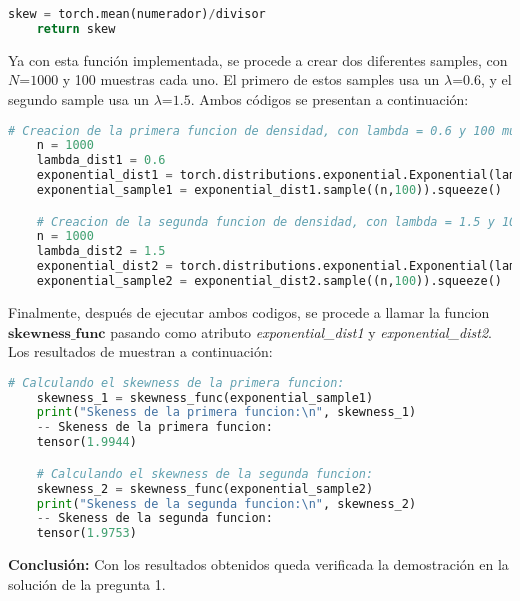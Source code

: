 \documentclass[spanish]{article}
\begin{document}
\begin{enumerate}
\begin{lstlisting}[language=Python]
    skew = torch.mean(numerador)/divisor
    return skew
\end{lstlisting}
Ya con esta funci\'{o}n implementada, se procede a crear dos diferentes samples, con $N\text{=1000}$ y 100 muestras cada uno. El primero de estos samples usa un $\lambda\text{=0.6}$, y el segundo sample usa un $\lambda\text{=1.5}$. Ambos c\'{o}digos se presentan a continuaci\'{o}n:
\begin{lstlisting}[language=Python]
    # Creacion de la primera funcion de densidad, con lambda = 0.6 y 100 muestras
    n = 1000
    lambda_dist1 = 0.6
    exponential_dist1 = torch.distributions.exponential.Exponential(lambda_dist1)
    exponential_sample1 = exponential_dist1.sample((n,100)).squeeze()

    # Creacion de la segunda funcion de densidad, con lambda = 1.5 y 100 muestras
    n = 1000
    lambda_dist2 = 1.5
    exponential_dist2 = torch.distributions.exponential.Exponential(lambda_dist2)
    exponential_sample2 = exponential_dist2.sample((n,100)).squeeze()
\end{lstlisting}
Finalmente, despu\'{e}s de ejecutar ambos codigos, se procede a llamar la funcion $\textbf{skewness\_func}$ pasando como atributo \emph{exponential\_dist1} y \emph{exponential\_dist2}. Los resultados de muestran a continuaci\'{o}n:
\begin{lstlisting}[language=Python]
    # Calculando el skewness de la primera funcion:
    skewness_1 = skewness_func(exponential_sample1)
    print("Skeness de la primera funcion:\n", skewness_1)
    -- Skeness de la primera funcion:
    tensor(1.9944)

    # Calculando el skewness de la segunda funcion:
    skewness_2 = skewness_func(exponential_sample2)
    print("Skeness de la segunda funcion:\n", skewness_2)
    -- Skeness de la segunda funcion:
    tensor(1.9753)
\end{lstlisting}
\textbf{Conclusi\'{o}n:} Con los resultados obtenidos queda verificada la demostraci\'{o}n en la soluci\'{o}n de la pregunta 1.
\end{enumerate}
\end{document}
